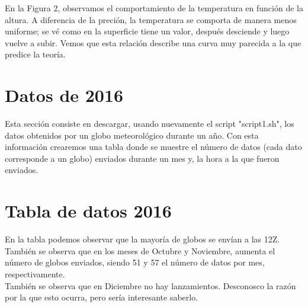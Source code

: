 \documentclass[a4paper]{article}
\begin{document}
En la Figura 2, observamos el comportamiento de la temperatura en función de la altura. A diferencia de la preción, la temperatura se comporta de manera menos uniforme; se vé como en la superficie tiene un valor, después desciende y luego vuelve a subir. Vemos que esta relación describe una curva muy parecida a la que predice la teoría.

\section*{Datos de 2016}
Esta sección consiste en descargar, usando nuevamente el script "script1.sh", los datos obtenidos por un globo meteorológico durante un año. Con esta información crearemos una tabla donde se muestre el número de datos (cada dato corresponde a un globo) enviados durante un mes y, la hora a la que fueron enviados. 

\section*{Tabla de datos 2016}
\begin{table}[htbp]
\begin{center}
\caption{observaciones realizadas a las 00Z y 12Z horas.}
\end{center}

\end{table}

En la tabla podemos observar que la mayoría de globos se envían a las 12Z. También se observa que en los meses de Octubre y Noviembre, aumenta el número de globos enviados, siendo 51 y 57 el número de datos por mes, respectivamente. \\
También se observa que en Diciembre no hay lanzamientos. Desconosco la razón por la que esto ocurra, pero sería interesante saberlo.
\end{document}
